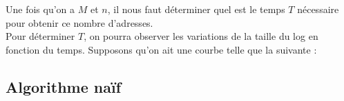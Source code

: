 \noindent Une fois qu'on a $M$ et $n$, il nous faut déterminer quel est le temps $T$ nécessaire pour obtenir ce nombre d'adresses. \\
Pour déterminer $T$, on pourra observer les variations de la taille du log en fonction du temps. Supposons qu'on ait une courbe telle que la suivante : 


\subsection{Algorithme naïf}